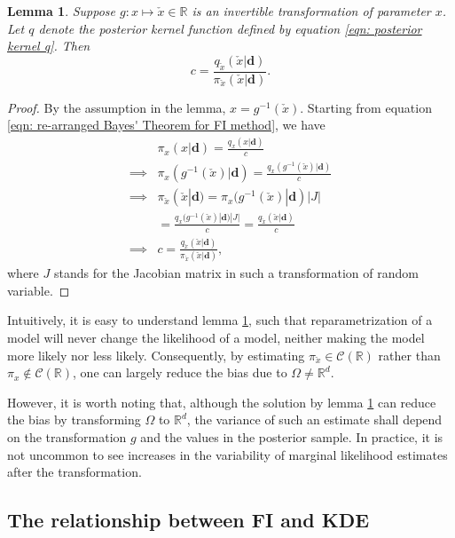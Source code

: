 \documentclass[%
 reprint,
 amsmath,amssymb,
 aps,
]{revtex4-2}
\newtheorem{lemma}[theorem]{Lemma}
\def\R{\mathbb{R}}
\def\ybold{\mathbf{d}}
\begin{document}
\begin{lemma} \label{lemma: FI transforming the re-arranged Bayes theorem}
    Suppose $g: x \mapsto \check{x} \in \R$ is an invertible transformation of parameter $x$. Let $q$ denote the posterior kernel function defined by equation \eqref{eqn: posterior kernel q}. Then
    \begin{equation*}
        c = \frac{q_{\check{x}}(\check{x}|\ybold)}{\pi_{\check{x}}(\check{x}|\ybold)}.
    \end{equation*}
\end{lemma}
\begin{proof}
    By the assumption in the lemma, $x = g^{-1}(\check{x})$. Starting from equation \eqref{eqn: re-arranged Bayes' Theorem for FI method}, we have
    \begin{align*}
        & \pi_x(x|\ybold) = \frac{q_x(x|\ybold)}{c} \\
        \implies & \pi_x(g^{-1}(\check{x})|\ybold) = \frac{q_x(g^{-1}(\check{x})|\ybold)}{c} \\
        \implies & \pi_{\check{x}}(\check{x}|\ybold) = \pi_x(g^{-1}(\check{x})|\ybold)|J| \\
        & = \frac{q_x(g^{-1}(\check{x})|\ybold)|J|}{c} = \frac{q_{\check{x}}(\check{x}|\ybold)}{c} \\
        \implies & c = \frac{q_{\check{x}}(\check{x}|\ybold)}{\pi_{\check{x}}(\check{x}|\ybold)},
    \end{align*}
    where $J$ stands for the Jacobian matrix in such a transformation of random variable.
\end{proof}
Intuitively, it is easy to understand lemma \ref{lemma: FI transforming the re-arranged Bayes theorem}, such that reparametrization of a model will never change the likelihood of a model, neither making the model more likely nor less likely. Consequently, by estimating $\pi_{\check{x}} \in \mathcal{C}(\R)$ rather than $\pi_x \notin \mathcal{C}(\R)$, one can largely reduce the bias due to $\Omega \neq \R^d$.

However, it is worth noting that, although the solution by lemma \ref{lemma: FI transforming the re-arranged Bayes theorem} can reduce the bias by transforming $\Omega$ to $\R^d$, the variance of such an estimate shall depend on the transformation $g$ and the values in the posterior sample. In practice, it is not uncommon to see increases in the variability of marginal likelihood estimates after the transformation.

\subsection{\label{subsec:relationship between FI and KDE} The relationship between FI and KDE}
\end{document}
